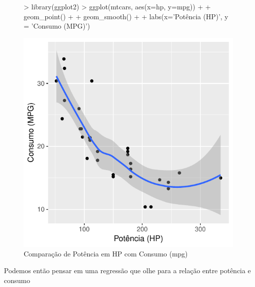 \documentclass[12pt,a4paper,oneside]{erdc}
\begin{document}
\begin{figure}[htpb]
\begin{Schunk}
\begin{Sinput}
> library(ggplot2)
> ggplot(mtcars, aes(x=hp, y=mpg)) +
+   geom_point() +
+   geom_smooth() +
+   labs(x='Potência (HP)', y = 'Consumo (MPG)')
\end{Sinput}
\end{Schunk}
\includegraphics{BP_Curso_TecComp_00_2019-consumHP}

\caption{Comparação de Potência em HP com Consumo (mpg)}

\end{figure}




%
%
	
	Podemos então pensar em uma regressão que olhe para a relação entre potência e  consumo
	
\end{document}
